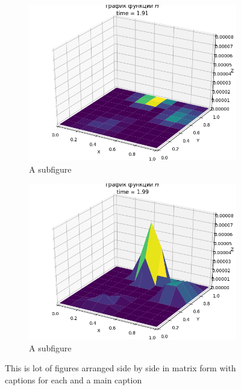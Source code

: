 \documentclass[14pt]{extreport}
\begin{document}
\begin{figure}[htb]
\centering
  \begin{subfigure}[b]{.24\linewidth}
    \centering
    \includegraphics[width=1.2\linewidth]{images/ex3/H/91}
    \caption{A subfigure}\label{img:ex3:H:91}
  \end{subfigure}%
  \begin{subfigure}[b]{.24\linewidth}
    \centering
    \includegraphics[width=1.2\linewidth]{images/ex3/H/99}
    \caption{A subfigure}\label{img:ex3:H:99}
  \end{subfigure}%

  \caption{This is   lot of figures arranged side by side in matrix form with captions for each and a main caption}\label{fig:1}
\end{figure}
\end{document}

